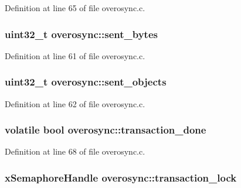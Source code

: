 \-Definition at line 65 of file overosync.\-c.

\hypertarget{structoverosync_ae75efe9626e6cd54b7f51937d7ccc8bd}{
\subsubsection[{sent\-\_\-bytes}]{\setlength{\rightskip}{0pt plus 5cm}uint32\-\_\-t {\bf overosync\-::sent\-\_\-bytes}}}\label{structoverosync_ae75efe9626e6cd54b7f51937d7ccc8bd}


\-Definition at line 61 of file overosync.\-c.

\hypertarget{structoverosync_ace6edc8026e30f605d99e5f01c6d66a9}{
\subsubsection[{sent\-\_\-objects}]{\setlength{\rightskip}{0pt plus 5cm}uint32\-\_\-t {\bf overosync\-::sent\-\_\-objects}}}\label{structoverosync_ace6edc8026e30f605d99e5f01c6d66a9}


\-Definition at line 62 of file overosync.\-c.

\hypertarget{structoverosync_a065e182f37469dcd89b3de4464d91267}{
\subsubsection[{transaction\-\_\-done}]{\setlength{\rightskip}{0pt plus 5cm}volatile bool {\bf overosync\-::transaction\-\_\-done}}}\label{structoverosync_a065e182f37469dcd89b3de4464d91267}


\-Definition at line 68 of file overosync.\-c.

\hypertarget{structoverosync_acca01c899cb020526ac2809ba6b27fc0}{
\subsubsection[{transaction\-\_\-lock}]{\setlength{\rightskip}{0pt plus 5cm}x\-Semaphore\-Handle {\bf overosync\-::transaction\-\_\-lock}}}\label{structoverosync_acca01c899cb020526ac2809ba6b27fc0}


